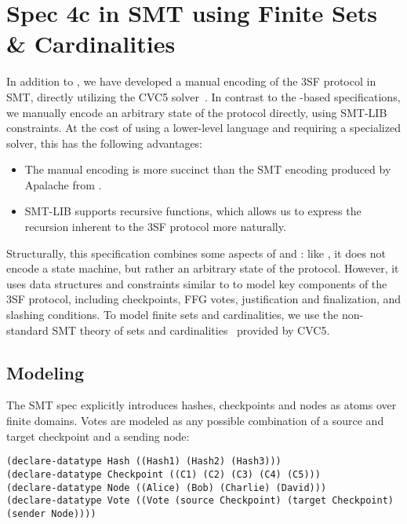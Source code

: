 
\section{Spec 4c in SMT using Finite Sets \& Cardinalities}

In addition to \SpecFour{}, we have developed a manual encoding of the 3SF
protocol in SMT, directly utilizing the CVC5 solver~\cite{DBLP:conf/tacas/BarbosaBBKLMMMN22}.
In contrast to the \tlap{}-based specifications, we manually encode an
arbitrary state of the protocol
directly, using SMT-LIB constraints. At the cost of using a lower-level language and
requiring a specialized solver, this has the following advantages:
\begin{itemize}
  \item The manual encoding is more succinct than the SMT encoding produced by
    Apalache from \tlap{}.
  \item SMT-LIB supports recursive functions, which allows us to express the
    recursion inherent to the 3SF protocol more naturally.
\end{itemize}

Structurally, this specification combines some aspects of \SpecTwo{} and
\SpecThree{}: like \SpecTwo{}, it does not encode a state machine, but rather
an arbitrary state of the protocol. However, it uses data structures and
constraints similar to \SpecThree{} to model key components of the 3SF
protocol, including checkpoints, FFG votes, justification and finalization,
and slashing conditions.
To model finite sets and cardinalities, we use the non-standard SMT theory of
sets and cardinalities~\cite{DBLP:journals/lmcs/BansalBRT18} provided by CVC5.

\subsection{Modeling}
The SMT spec explicitly introduces hashes, checkpoints and nodes as atoms over
finite domains. Votes are modeled as any possible combination
of a source and target checkpoint and a sending node:

\begin{lstlisting}[language=smt]
(declare-datatype Hash ((Hash1) (Hash2) (Hash3)))
(declare-datatype Checkpoint ((C1) (C2) (C3) (C4) (C5)))
(declare-datatype Node ((Alice) (Bob) (Charlie) (David)))
(declare-datatype Vote ((Vote (source Checkpoint) (target Checkpoint) (sender Node))))
\end{lstlisting}

